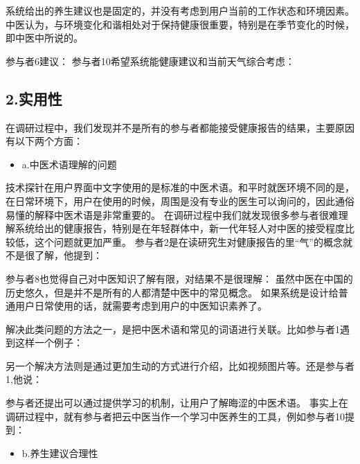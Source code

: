 系统给出的养生建议也是固定的，并没有考虑到用户当前的工作状态和环境因素。中医认为，与环境变化和谐相处对于保持健康很重要，特别是在季节变化的时候，即中医中所说的。

参与者6建议： 
参与者10希望系统能健康建议和当前天气综合考虑：


\subsection{2.实用性}
在调研过程中，我们发现并不是所有的参与者都能接受健康报告的结果，主要原因有以下两个方面：

\begin{itemize}
\item a.中医术语理解的问题
\end{itemize}

技术探针在用户界面中文字使用的是标准的中医术语。和平时就医环境不同的是，在日常环境下，用户在使用的时候，周围是没有专业的医生可以询问的，因此通俗易懂的解释中医术语是非常重要的。
在调研过程中我们就发现很多参与者很难理解系统给出的健康报告，特别是在年轻群体中，新一代年轻人对中医的接受程度比较低，这个问题就更加严重。
参与者2是在读研究生对健康报告的里“气”的概念就不是很了解，他提到：

参与者8也觉得自己对中医知识了解有限，对结果不是很理解：
虽然中医在中国的历史悠久，但是并不是所有的人都清楚中医中的常见概念。 如果系统是设计给普通用户日常使用的话，就需要考虑到用户的中医知识素养了。

解决此类问题的方法之一，是把中医术语和常见的词语进行关联。比如参与者1遇到这样一个例子：

另一个解决方法则是通过更加生动的方式进行介绍，比如视频图片等。还是参与者1,他说：

参与者还提出可以通过提供学习的机制，让用户了解晦涩的中医术语。
事实上在调研过程中，就有参与者把云中医当作一个学习中医养生的工具，例如参与者10提到：

\begin{itemize}
\item b.养生建议合理性
\end{itemize}

